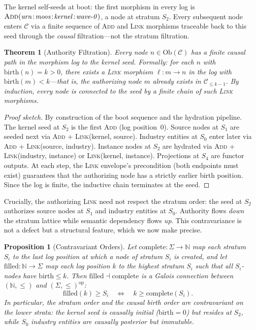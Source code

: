 \documentclass[submission,copyright,creativecommons]{eptcs}
\newtheorem{theorem}{Theorem}
\newtheorem{proposition}{Proposition}
\begin{document}
The kernel self-seeds at boot: the first morphism in every log is
$\textsc{Add}(\mathit{urn\!:\!moos\!:\!kernel\!:\!wave\text{-}0})$, a node at
stratum $S_2$. Every subsequent node enters $\mathcal{C}$ via a finite
sequence of \textsc{Add} and \textsc{Link} morphisms traceable back to this
seed through the \emph{causal} filtration---not the stratum filtration.

\begin{theorem}[Authority Filtration]
\label{thm:authority}
Every node $n \in \mathrm{Ob}(\mathcal{C})$ has a finite causal path in the
morphism log to the kernel seed. Formally: for each $n$ with
$\mathrm{birth}(n) = k > 0$, there exists a \textsc{Link} morphism
$\ell\colon m \to n$ in the log with $\mathrm{birth}(m) < k$---that is, the
authorizing node $m$ already exists in $\mathcal{C}_{\leq k-1}$.
By induction, every node is connected to the seed by a finite chain of such
\textsc{Link} morphisms.
\end{theorem}

\begin{proof}[Proof sketch]
By construction of the boot sequence and the hydration pipeline. The kernel
seed at $S_2$ is the first \textsc{Add} (log position~0). Source nodes at
$S_1$ are seeded next via \textsc{Add} + \textsc{Link}(kernel, source).
Industry entities at $S_0$ enter later via \textsc{Add} +
\textsc{Link}(source, industry). Instance nodes at $S_2$ are hydrated via
\textsc{Add} + \textsc{Link}(industry, instance) or
\textsc{Link}(kernel, instance). Projections at $S_4$ are functor outputs.
At each step, the \textsc{Link} envelope's precondition (both endpoints must
exist) guarantees that the authorizing node has a strictly earlier birth
position. Since the log is finite, the inductive chain terminates at the seed.
\end{proof}

Crucially, the authorizing \textsc{Link} need not respect the stratum order:
the seed at $S_2$ authorizes source nodes at $S_1$ and industry entities at
$S_0$. Authority flows \emph{down} the stratum lattice while semantic
dependency flows \emph{up}. This contravariance is not a defect but a
structural feature, which we now make precise.

\begin{proposition}[Contravariant Orders]
\label{prop:contravariant}
Let $\mathrm{complete}\colon \Sigma \to \mathbb{N}$ map each stratum $S_i$ to
the last log position at which a node of stratum $S_i$ is created, and let
$\mathrm{filled}\colon \mathbb{N} \to \Sigma$ map each log position $k$ to
the highest stratum $S_i$ such that all $S_i$-nodes have
$\mathrm{birth} \leq k$. Then $\mathrm{filled} \dashv \mathrm{complete}$
is a Galois connection between $(\mathbb{N}, \leq)$ and
$(\Sigma, \leq)^{\mathrm{op}}$:
\[
\mathrm{filled}(k) \geq S_i
\quad\Longleftrightarrow\quad
k \geq \mathrm{complete}(S_i).
\]
In particular, the stratum order and the causal birth order are contravariant
on the lower strata: the kernel seed is causally initial
($\mathrm{birth} = 0$) but resides at $S_2$, while $S_0$ industry entities
are causally posterior but immutable.
\end{proposition}
\end{document}
